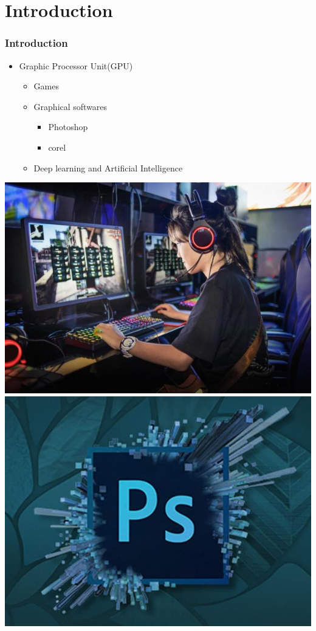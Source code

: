 \documentclass{beamer}
\begin{document}
\section{Introduction}
\begin{frame}
\frametitle{Introduction}
\begin{itemize}
	\item Graphic Processor Unit(GPU)
	\begin{itemize}
		\item {Games}
		\item {Graphical softwares}
			\begin{itemize}
				\item{Photoshop}
				\item{corel}
			\end{itemize}
		\item {Deep learning and Artificial Intelligence}
	\end{itemize}
\end{itemize}
\includegraphics[scale=0.15]{game}
\includegraphics[scale=0.15]{Photoshop}

\end{frame}
\end{document}
